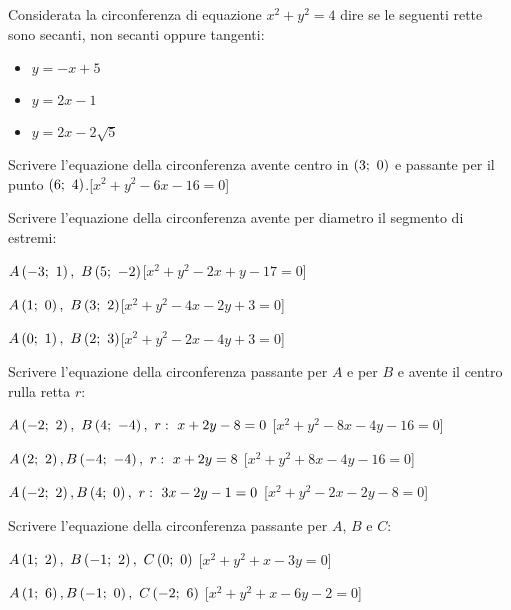 \begin{esercizio}\label{ese:}
Considerata la circonferenza di equazione \(x^2 +y^2 = 4\) dire se le seguenti 
rette sono secanti, non secanti oppure tangenti:
\begin{itemize} [nosep]
 \item \(y=-x+5\)
 \item \(y=2x-1\)
 \item \(y=2x-2\sqrt{5}\)
\end{itemize}
\end{esercizio}

\begin{esercizio}\label{ese:}
Scrivere l'equazione della circonferenza avente centro in \(\left( 3;~0 \right)\) e 
passante per il punto \(\left( 6;~4 \right)\).\hfill[\(x^2+y^2-6x-16=0\)]
\end{esercizio}

\begin{esercizio}\label{ese:}
Scrivere l'equazione della circonferenza avente per diametro il segmento di 
estremi:
 \begin{enumeratea}
  \item  \(A\left( -3;~1 \right),~B\left( 5;~-2 \right)\)\hfill [\(x^2+y^2-2x+y-17=0\)]
  \item  \(A\left( 1;~0 \right),~B\left( 3;~2 \right)\)\hfill [\(x^2+y^2-4x-2y+3=0\)]
  \item  \(A\left( 0;~1 \right),~B\left( 2;~3 \right)\)\hfill [\(x^2+y^2-2x-4y+3=0\)]
 \end{enumeratea}
\end{esercizio}

\begin{esercizio}\label{ese:}
Scrivere l'equazione della circonferenza passante per \(A\) e per \(B\) e 
avente il centro rulla retta \(r\):
 \begin{enumeratea}
  \item  \(A\left( -2;~2 \right),~B\left( 4;~-4 \right),~r:~x+2y-8=0\)
  \hfill [\(x^2+y^2-8x-4y-16=0\)]
  \item  \(A\left( 2;~2 \right), B\left( -4;~-4 \right),~r:~x+2y=8\)
  \hfill [\(x^2+y^2+8x-4y-16=0\)]
  \item  \(A\left( -2;~2 \right), B\left( 4;~0 \right),~r:~3x-2y-1=0\)
  \hfill [\(x^2+y^2-2x-2y-8=0\)]
 \end{enumeratea}
\end{esercizio}

\begin{esercizio}\label{ese:}
Scrivere l'equazione della circonferenza passante per \(A\), \(B\) e \(C\):
 \begin{enumeratea}
  \item  \(A\left( 1;~2 \right),~B\left( -1;~2 \right),~C\left( 0;~0 \right)\)
  \hfill [\(x^2+y^2+x-3y=0\)]
  \item  \(A\left( 1;~6 \right), B\left( -1;~0 \right),~C\left( -2;~6 \right)\)
  \hfill [\(x^2+y^2+x-6y-2=0\)]
 \end{enumeratea}
\end{esercizio}

